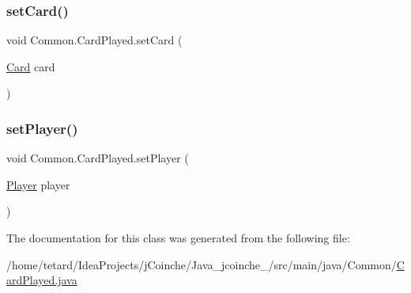 \mbox{\label{classCommon_1_1CardPlayed_ad456e1fb513fb05d53f21d80f399fa24}} 
\subsubsection{\texorpdfstring{set\+Card()}{setCard()}}
{\footnotesize\ttfamily void Common.\+Card\+Played.\+set\+Card (\begin{DoxyParamCaption}\item[{\mbox{\hyperlink{classCommon_1_1Card}{Card}}}]{card }\end{DoxyParamCaption})\hspace{0.3cm}{\ttfamily [inline]}}

\mbox{\label{classCommon_1_1CardPlayed_ab1e8317983a794c99aef643569ba93ce}} 
\subsubsection{\texorpdfstring{set\+Player()}{setPlayer()}}
{\footnotesize\ttfamily void Common.\+Card\+Played.\+set\+Player (\begin{DoxyParamCaption}\item[{\mbox{\hyperlink{classCommon_1_1Player}{Player}}}]{player }\end{DoxyParamCaption})\hspace{0.3cm}{\ttfamily [inline]}}



The documentation for this class was generated from the following file\+:\begin{DoxyCompactItemize}
\item 
/home/tetard/\+Idea\+Projects/j\+Coinche/\+Java\+\_\+jcoinche\+\_/src/main/java/\+Common/\mbox{\hyperlink{CardPlayed_8java}{Card\+Played.\+java}}\end{DoxyCompactItemize}
